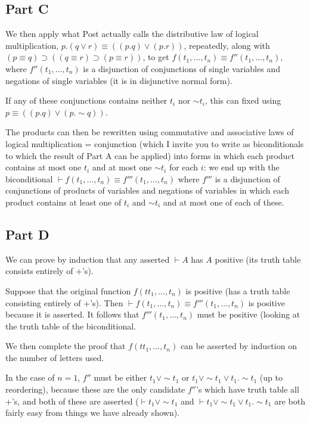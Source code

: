 \documentclass[12pt]{article}
\begin{document}
\subsection{Part C}

We then apply what Post actually calls the distributive law of logical multiplication, $p .(q \vee r) \equiv(( p.q) \vee( p.r))$, repeatedly, along with $(p \equiv q) \supset ((q \equiv r) \supset (p\equiv r))$, to get $f(t_1,\ldots,t_n) \equiv f''(t_1,\ldots,t_n)$, where $f''(t_1,\ldots,t_n)$ is a disjunction of conjunctions of single variables and negations of single variables (it is in disjunctive normal form).

If any of these conjunctions contains neither $t_i$ nor $\sim t_i$, this can fixed using $p \equiv ((p.q) \vee (p.\sim q))$. 

The products can then be rewritten using commutative and associative laws of logical multiplication = conjunction (which I invite you to write as biconditionals to which the result of Part A can be applied) into forms in which each product contains at most one $t_i$ and at most one $\sim t_i$ for each $i$:  we end up with the biconditional $\vdash f(t_1,\ldots,t_n) \equiv f'''(t_1,\ldots,t_n)$ where $f'''$ is a disjunction of conjunctions of products of variables and negations of variables in which each product contains at least one of $t_i$ and $\sim t_i$ and
at most one of each of these.

\subsection{Part D}

We can prove by induction that any asserted $\vdash A$ has $A$ positive (its truth table consists entirely of +'s).

Suppose that the original function $f(tt_1,\ldots,t_n)$ is positive (has a truth table consisting entirely of +'s).  Then $\vdash f(t_1,\ldots,t_n) \equiv f'''(t_1,\ldots,t_n)$ is positive because it is asserted.  It follows that $f'''(t_1,\ldots,t_n)$ must be positive (looking at the truth table of the biconditional.

We then complete the proof that $f(tt_1,\ldots,t_n)$  can be asserted by induction on the number of letters used.

In the case of $n=1$, $f''$ must be either $t_1 \vee \sim t_1$ or $t_1 \vee \sim t_1 \vee t_1.\sim t_1$ (up to reordering), because these are the only candidate $f''$'s which have truth table all +'s, and both of these are asserted
($\vdash t_1 \vee \sim t_1$ and $\vdash t_1 \vee \sim t_1 \vee t_1.\sim t_1$ are both fairly easy from things we have already shown).
\end{document}
